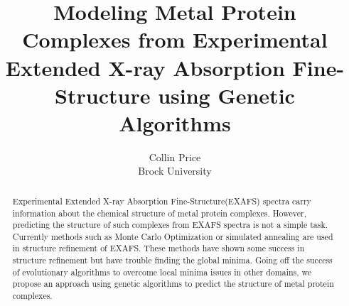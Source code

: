 \documentclass[12pt,letterpaper,draft,notitlepage]{article}
\title{Modeling Metal Protein Complexes from Experimental Extended X-ray Absorption Fine-Structure using Genetic Algorithms}
\author{Collin Price \\ Brock University}
\begin{document}
\maketitle
\thispagestyle{empty}

\begin{abstract}

Experimental Extended X-ray Absorption Fine-Structure(EXAFS) spectra carry information about the chemical structure of metal protein complexes. However, predicting the structure of such complexes from EXAFS spectra is not a simple task. Currently methods such as Monte Carlo Optimization or simulated annealing are used in structure refinement of EXAFS. These methods have shown some success in structure refinement but have trouble finding the global minima. Going off the success of evolutionary algorithms to overcome local minima issues in other domains, we propose an approach using genetic algorithms to predict the  structure of metal protein complexes.

\end{abstract}
\end{document}
